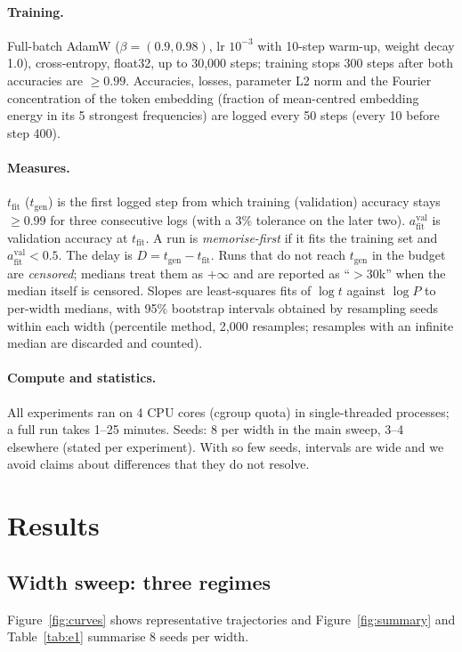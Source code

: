 \documentclass{article} %
\newcommand{\tfit}{t_{\mathrm{fit}}}
\newcommand{\tgen}{t_{\mathrm{gen}}}
\newcommand{\vafit}{a^{\mathrm{val}}_{\mathrm{fit}}}
\begin{document}
\paragraph{Training.} Full-batch AdamW \citep{loshchilov2019decoupled} ($\beta{=}(0.9,0.98)$, lr $10^{-3}$ with 10-step warm-up, weight decay 1.0), cross-entropy, float32, up to 30{,}000 steps; training stops 300 steps after both accuracies are $\ge0.99$. Accuracies, losses, parameter L2 norm and the Fourier concentration of the token embedding (fraction of mean-centred embedding energy in its 5 strongest frequencies) are logged every 50 steps (every 10 before step 400).

\paragraph{Measures.} $\tfit$ ($\tgen$) is the first logged step from which training (validation) accuracy stays $\ge0.99$ for three consecutive logs (with a $3\%$ tolerance on the later two). $\vafit$ is validation accuracy at $\tfit$. A run is \emph{memorise-first} if it fits the training set and $\vafit<0.5$. The delay is $D=\tgen-\tfit$. Runs that do not reach $\tgen$ in the budget are \emph{censored}; medians treat them as $+\infty$ and are reported as ``$>$30k'' when the median itself is censored. Slopes are least-squares fits of $\log t$ against $\log P$ to per-width medians, with 95\% bootstrap intervals obtained by resampling seeds within each width (percentile method, 2{,}000 resamples; resamples with an infinite median are discarded and counted).

\paragraph{Compute and statistics.} All experiments ran on 4 CPU cores (cgroup quota) in single-threaded processes; a full run takes 1--25 minutes. Seeds: 8 per width in the main sweep, 3--4 elsewhere (stated per experiment). With so few seeds, intervals are wide and we avoid claims about differences that they do not resolve.

\section{Results}
\subsection{Width sweep: three regimes}
\label{sec:e1}
Figure~\ref{fig:curves} shows representative trajectories and Figure~\ref{fig:summary} and Table~\ref{tab:e1} summarise 8 seeds per width.
\end{document}
